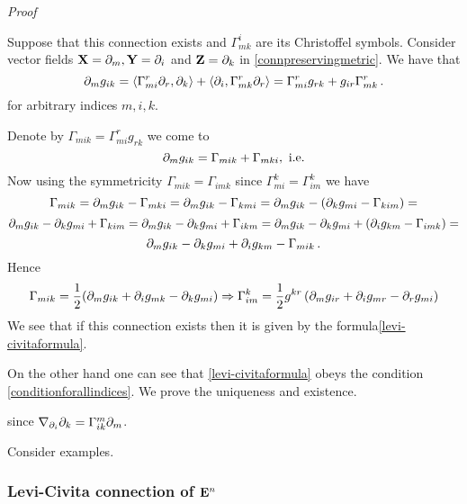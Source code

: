 \documentclass[12pt]{article}
\theoremstyle{theorem}
\numberwithin{equation}{section}
\begin{document}


 {\sl Proof}

{\small Suppose that this connection exists and $\Gamma^i_{mk}$ are its Christoffel symbols.
 Consider vector fields ${\bf X}=\partial_m,{\bf Y}=\partial_i$ and ${\bf Z}=\partial_k$ in \eqref{connpreservingmetric}.
  We have that
            \begin{equation}\label{conditionforallindices}
         \partial_mg_{ik}=\langle\Gamma_{mi}^r\partial_r,\partial_k\rangle+\langle\partial_i,\Gamma^r_{mk}\partial_r\rangle=
              \Gamma^r_{mi}g_{rk}+g_{ir}\Gamma^r_{mk}\,.
            \end{equation}
   for arbitrary indices $m,i,k$.

    Denote by $\Gamma_{mik}=\Gamma^r_{mi}g_{rk}$ we come to
                $$
          \partial_mg_{ik}=\Gamma_{mik}+\Gamma_{mki}, \,\,{\rm i.e.}
                $$
    Now using the symmetricity $\Gamma_{mik}=\Gamma_{imk}$ since $\Gamma_{mi}^k=\Gamma_{im}^k$ we have
                $$
    \Gamma_{mik}=\partial_mg_{ik}-\Gamma_{mki}=\partial_mg_{ik}-\Gamma_{kmi}=\partial_mg_{ik}-\left(\partial_kg_{mi}-\Gamma_{kim}\right)=
                $$
                $$
\partial_mg_{ik}-\partial_kg_{mi}+\Gamma_{kim}=\partial_mg_{ik}-\partial_kg_{mi}+\Gamma_{ikm}=
\partial_mg_{ik}-\partial_kg_{mi}+\left(\partial_ig_{km}-\Gamma_{imk}\right)=
                $$
                $$
       \partial_mg_{ik}-\partial_kg_{mi}+\partial_ig_{km}-\Gamma_{mik}\,.
                $$
 Hence
                \begin{equation}\label{levi-vivitaforlowerindices}
   \Gamma_{mik}={1\over 2}(\partial_mg_{ik}+\partial_ig_{mk}-\partial_kg_{mi})\Rightarrow \Gamma^k_{im}=
   {1\over 2}g^{kr}\left(\partial_mg_{ir}+\partial_ig_{mr}-\partial_rg_{mi}\right)
                \end{equation}
  We see that if this connection exists then it is given by the formula\eqref{levi-civitaformula}.

  On the other hand one can see that \eqref{levi-civitaformula} obeys the condition
  \eqref{conditionforallindices}. We prove the uniqueness and existence.

since $\nabla_{\partial_i}\partial_k=\Gamma_{ik}^m\partial_m$.}

\m


Consider examples.

\subsubsection{Levi-Civita connection of ${\bf E}^n$}\label{canonicalflat=levicivita}
\end{document}
